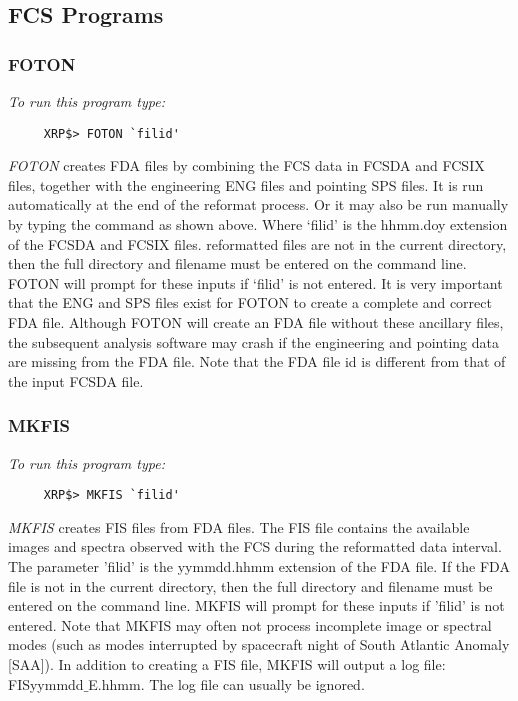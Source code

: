 \subsection{FCS Programs}

\subsubsection{FOTON}

{\em To run this program type:}
\begin{verbatim}
     XRP$> FOTON `filid'
\end{verbatim}
{\em FOTON} creates FDA files by combining the FCS data in FCSDA and FCSIX files,
together with the engineering ENG files and pointing SPS files. It is run
automatically at the end of the reformat process. Or it may also be run manually
by typing the command as shown above.
Where `filid' is the hhmm.doy extension of the FCSDA and FCSIX files.
reformatted files are not in the current directory, then the full directory and
filename must be entered on the command line. FOTON will prompt for these
inputs if `filid' is not entered.  It is very important that the ENG and SPS
files exist for FOTON to create a complete and correct FDA file.  Although
FOTON will create an FDA  file without these ancillary files, the subsequent
analysis software may  crash if the engineering and pointing data are missing
from the FDA file. Note that the FDA file id is different from that of the
input FCSDA file.

\subsubsection{MKFIS}

{\em To run this program type:}
\begin{verbatim}
     XRP$> MKFIS `filid'
\end{verbatim}
{\em MKFIS} creates FIS files from FDA files.  The FIS file contains  the
available images and spectra observed with the  FCS during the reformatted data
interval.  The parameter 'filid' is the yymmdd.hhmm extension of  the FDA file.
If the FDA file is not in the current directory, then the full  directory and
filename must be entered on the command line. MKFIS will prompt  for these
inputs if 'filid' is not entered. Note that MKFIS may often not  process
incomplete image or spectral modes (such as modes interrupted by  spacecraft
night of South Atlantic Anomaly [SAA]). In addition to creating a FIS  file,
MKFIS will output a log file: FISyymmdd$\_$E.hhmm. The log file can usually  be
ignored.


